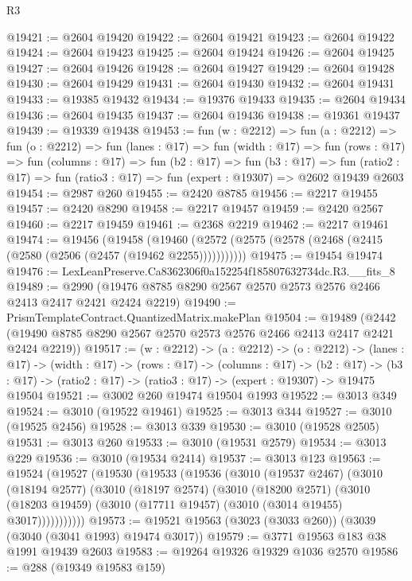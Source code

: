 \begin{lexlean}{R3}
\begin{coremodule}
@19421 := @2604 @19420
@19422 := @2604 @19421
@19423 := @2604 @19422
@19424 := @2604 @19423
@19425 := @2604 @19424
@19426 := @2604 @19425
@19427 := @2604 @19426
@19428 := @2604 @19427
@19429 := @2604 @19428
@19430 := @2604 @19429
@19431 := @2604 @19430
@19432 := @2604 @19431
@19433 := @19385 @19432
@19434 := @19376 @19433
@19435 := @2604 @19434
@19436 := @2604 @19435
@19437 := @2604 @19436
@19438 := @19361 @19437
@19439 := @19339 @19438
@19453 := fun (w : @2212) =>
  fun (a : @2212) =>
  fun (o : @2212) =>
  fun (lanes : @17) =>
  fun (width : @17) =>
  fun (rows : @17) =>
  fun (columns : @17) =>
  fun (b2 : @17) =>
  fun (b3 : @17) =>
  fun (ratio2 : @17) => fun (ratio3 : @17) => fun (expert : @19307) => @2602 @19439 @2603
@19454 := @2987 @260
@19455 := @2420 @8785
@19456 := @2217 @19455
@19457 := @2420 @8290
@19458 := @2217 @19457
@19459 := @2420 @2567
@19460 := @2217 @19459
@19461 := @2368 @2219
@19462 := @2217 @19461
@19474 := @19456
    (@19458 (@19460 (@2572 (@2575 (@2578 (@2468 (@2415 (@2580 (@2506 (@2457 (@19462 @2255)))))))))))
@19475 := @19454 @19474
@19476 := LexLeanPreserve.Ca8362306f0a152254f185807632734dc.R3.__fits_8
@19489 := @2990 (@19476 @8785 @8290 @2567 @2570 @2573 @2576 @2466 @2413 @2417 @2421 @2424 @2219)
@19490 := PrismTemplateContract.QuantizedMatrix.makePlan
@19504 := @19489
    (@2442 (@19490 @8785 @8290 @2567 @2570 @2573 @2576 @2466 @2413 @2417 @2421 @2424 @2219))
@19517 := (w : @2212) ->
  (a : @2212) ->
  (o : @2212) ->
  (lanes : @17) ->
  (width : @17) ->
  (rows : @17) ->
  (columns : @17) ->
  (b2 : @17) -> (b3 : @17) -> (ratio2 : @17) -> (ratio3 : @17) -> (expert : @19307) -> @19475 @19504
@19521 := @3002 @260 @19474 @19504 @1993
@19522 := @3013 @349
@19524 := @3010 (@19522 @19461)
@19525 := @3013 @344
@19527 := @3010 (@19525 @2456)
@19528 := @3013 @339
@19530 := @3010 (@19528 @2505)
@19531 := @3013 @260
@19533 := @3010 (@19531 @2579)
@19534 := @3013 @229
@19536 := @3010 (@19534 @2414)
@19537 := @3013 @123
@19563 := @19524
    (@19527
      (@19530
        (@19533
          (@19536
            (@3010
              (@19537 @2467)
              (@3010
                (@18194 @2577)
                (@3010
                  (@18197 @2574)
                  (@3010
                    (@18200 @2571)
                    (@3010
                      (@18203 @19459)
                      (@3010 (@17711 @19457) (@3010 (@3014 @19455) @3017)))))))))))
@19573 := @19521 @19563 (@3023 (@3033 @260)) (@3039 (@3040 (@3041 @1993) @19474 @3017))
@19579 := @3771 @19563 @183 @38 @1991 @19439 @2603
@19583 := @19264 @19326 @19329 @1036 @2570
@19586 := @288 (@19349 @19583 @159)

\end{coremodule}
\end{lexlean}
